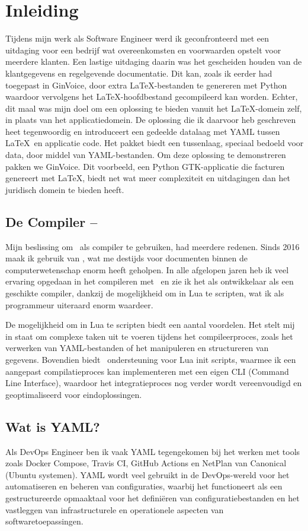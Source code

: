 \section{Inleiding}
Tijdens mijn werk als Software Engineer werd ik geconfronteerd met een uitdaging voor een bedrijf wat overeenkomsten en voorwaarden opstelt voor meerdere klanten.
Een lastige uitdaging daarin was het gescheiden houden van de klantgegevens en regelgevende documentatie.
Dit kan, zoals ik eerder had toegepast in GinVoice\cite{ginvoice}, door extra \LaTeX-bestanden te genereren met Python waardoor vervolgens het \LaTeX-hoofdbestand gecompileerd kan worden.
Echter, dit maal was mijn doel om een oplossing te bieden vanuit het \LaTeX-domein zelf, in plaats van het applicatiedomein.
De oplossing die ik daarvoor heb geschreven heet tegenwoordig \cite{lua-placeholders} en introduceert een gedeelde datalaag met YAML tussen \LaTeX\ en applicatie code.
Het pakket biedt een tussenlaag, speciaal bedoeld voor data, door middel van YAML-bestanden.
Om deze oplossing te demonstreren pakken we GinVoice.
Dit voorbeeld, een Python GTK-applicatie die facturen genereert met \LaTeX, biedt net wat meer complexiteit en uitdagingen dan het juridisch domein te bieden heeft.

\subsection{De Compiler -- \LuaLaTeX}
Mijn beslissing om \LuaLaTeX\ als compiler te gebruiken, had meerdere redenen.
Sinds 2016 maak ik gebruik van \LuaLaTeX, wat me destijds voor documenten binnen de computerwetenschap enorm heeft geholpen.
In alle afgelopen jaren heb ik veel ervaring opgedaan in het compileren met \LuaLaTeX\ en zie ik het als ontwikkelaar als een geschikte compiler, dankzij de mogelijkheid om in Lua te scripten, wat ik als programmeur uiteraard enorm waardeer.

De mogelijkheid om in Lua te scripten biedt een aantal voordelen.
Het stelt mij in staat om complexe taken uit te voeren tijdens het compileerproces, zoals het verwerken van YAML-bestanden of het manipuleren en structureren van gegevens.
Bovendien biedt \LuaLaTeX\ ondersteuning voor Lua init scripts, waarmee ik een aangepast compilatieproces kan implementeren met een eigen CLI (Command Line Interface), waardoor het integratieproces nog verder wordt vereenvoudigd en geoptimaliseerd voor eindoplossingen.

\subsection{Wat is YAML?}
Als DevOps Engineer ben ik vaak YAML tegengekomen bij het werken met tools zoals Docker Compose, Travis CI, GitHub Actions en NetPlan van Canonical (Ubuntu systemen).
YAML wordt veel gebruikt in de DevOps-wereld voor het automatiseren en beheren van configuraties, waarbij het functioneert als een gestructureerde opmaaktaal voor het definiëren van configuratiebestanden en het vastleggen van infrastructurele en operationele aspecten van softwaretoepassingen.

